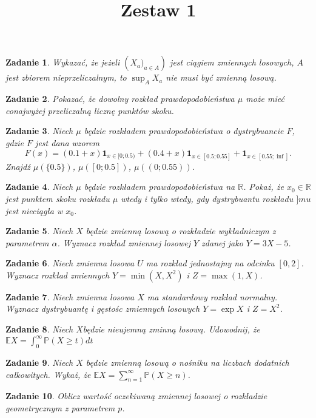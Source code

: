 \documentclass{mwart}
\title{Zestaw 1}
\newtheorem{zd}{Zadanie}
\begin{document}

\maketitle
\begin{zd}
Wykazać, że jeżeli $\left(X_a)_{a\in A}\right)$ jest ciągiem zmiennych losowych, $A$ jest zbiorem nieprzeliczalnym, to $\sup_AX_a$ nie musi być zmienną losową.
\end{zd}

\begin{zd}
Pokazać, że dowolny rozkład prawdopodobieństwa $\mu$ może mieć conajwyżej przeliczalną licznę punktów skoku.
\end{zd}

\begin{zd}
Niech $\mu$ będzie rozkładem prawdopodobieństwa o dystrybuancie $F$, gdzie $F$ jest dana wzorem
\begin{displaymath}
F(x) = (0.1+x)\pmb{1}_{x\in[0; 0.5)} + (0.4+x)\pmb{1}_{x\in[0.5; 0.55]} + \pmb{1}_{x\in[0.55; \inf]}.
\end{displaymath}
Znajdź $\mu(\{0.5\})$, $\mu([0; 0.5])$, $\mu((0; 0.55))$.
\end{zd}

\begin{zd}
Niech $\mu$ będzie rozkładem prawdopodobieństwa na $\mathbb{R}$. Pokaż, że $x_0\in \mathbb{R}$ jest punktem skoku rozkładu $\mu$ wtedy i tylko wtedy, gdy dystrybuantu rozkładu $]mu$ jest nieciągła w $x_0$.
\end{zd}

\begin{zd}
Niech $X$ będzie zmienną losową o rozkładzie wykładniczym z parametrem $\alpha$. Wyznacz rozkład zmiennej losowej $Y$ zdanej jako $Y=3X-5$.
\end{zd}

\begin{zd}
Niech zmienna losowa $U$ ma rozkład jednostajny na odcinku $[0, 2]$. Wyznacz rozkład zmiennych $Y=\min(X, X^2)$ i $Z=\max(1, X)$.
\end{zd}

\begin{zd}
Niech zmienna losowa $X$ ma standardowy rozkład normalny. Wyznacz dystrybuantę i gęstośc zmiennych losowych $Y=\exp{X}$ i $Z=X^2$.
\end{zd}

\begin{zd}
Niech $X$będzie nieujemną zminną losową. Udowodnij, że $\mathbb{E}X = \int_{0}^{\infty}\mathbb{P}\left(X \geq t\right)dt$
\end{zd}

\begin{zd}
Niech $X$ będzie zmienną losową o nośniku na liczbach dodatnich całkowitych. Wykaż, że $\mathbb{E}X = \sum_{n=1}^{\infty}\mathbb{P}\left(X \geq n\right)$.
\end{zd}

\begin{zd}
Oblicz wartość oczekiwaną zmiennej losowej o rozkładzie geometrycznym z parametrem $p$.
\end{zd}
\end{document}
